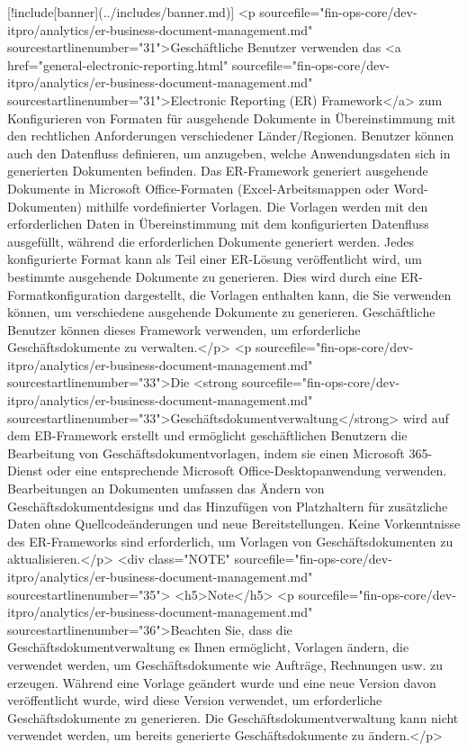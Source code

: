 [!include[banner](../includes/banner.md)]
<p sourcefile="fin-ops-core/dev-itpro/analytics/er-business-document-management.md" sourcestartlinenumber="31">Geschäftliche Benutzer verwenden das <a href="general-electronic-reporting.html" sourcefile="fin-ops-core/dev-itpro/analytics/er-business-document-management.md" sourcestartlinenumber="31">Electronic Reporting (ER) Framework</a> zum Konfigurieren von Formaten für ausgehende Dokumente in Übereinstimmung mit den rechtlichen Anforderungen verschiedener Länder/Regionen. Benutzer können auch den Datenfluss definieren, um anzugeben, welche Anwendungsdaten sich in generierten Dokumenten befinden. Das ER-Framework generiert ausgehende Dokumente in Microsoft Office-Formaten (Excel-Arbeitsmappen oder Word-Dokumenten) mithilfe vordefinierter Vorlagen. Die Vorlagen werden mit den erforderlichen Daten in Übereinstimmung mit dem konfigurierten Datenfluss ausgefüllt, während die erforderlichen Dokumente generiert werden. Jedes konfigurierte Format kann als Teil einer ER-Lösung veröffentlicht wird, um bestimmte ausgehende Dokumente zu generieren. Dies wird durch eine ER-Formatkonfiguration dargestellt, die Vorlagen enthalten kann, die Sie verwenden können, um verschiedene ausgehende Dokumente zu generieren. Geschäftliche Benutzer können dieses Framework verwenden, um erforderliche Geschäftsdokumente zu verwalten.</p>
<p sourcefile="fin-ops-core/dev-itpro/analytics/er-business-document-management.md" sourcestartlinenumber="33">Die <strong sourcefile="fin-ops-core/dev-itpro/analytics/er-business-document-management.md" sourcestartlinenumber="33">Geschäftsdokumentverwaltung</strong> wird auf dem EB-Framework erstellt und ermöglicht geschäftlichen Benutzern die Bearbeitung von Geschäftsdokumentvorlagen, indem sie einen Microsoft 365-Dienst oder eine entsprechende Microsoft Office-Desktopanwendung verwenden. Bearbeitungen an Dokumenten umfassen das Ändern von Geschäftsdokumentdesigns und das Hinzufügen von Platzhaltern für zusätzliche Daten ohne Quellcodeänderungen und neue Bereitstellungen. Keine Vorkenntnisse des ER-Frameworks sind erforderlich, um Vorlagen von Geschäftsdokumenten zu aktualisieren.</p>
<div class="NOTE" sourcefile="fin-ops-core/dev-itpro/analytics/er-business-document-management.md" sourcestartlinenumber="35">
<h5>Note</h5>
<p sourcefile="fin-ops-core/dev-itpro/analytics/er-business-document-management.md" sourcestartlinenumber="36">Beachten Sie, dass die Geschäftsdokumentverwaltung es Ihnen ermöglicht, Vorlagen ändern, die verwendet werden, um Geschäftsdokumente wie Aufträge, Rechnungen usw. zu erzeugen. Während eine Vorlage geändert wurde und eine neue Version davon veröffentlicht wurde, wird diese Version verwendet, um erforderliche Geschäftsdokumente zu generieren. Die Geschäftsdokumentverwaltung kann nicht verwendet werden, um bereits generierte Geschäftsdokumente zu ändern.</p>
